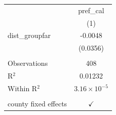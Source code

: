 
\begingroup
\centering
\begin{tabular}{lc}
   \toprule
                        & pref\_cal\\   
                        & (1)\\  
   \midrule 
   dist\_groupfar       & -0.0048\\   
                        & (0.0356)\\   
    \\
   Observations         & 408\\  
   R$^2$                & 0.01232\\  
   Within R$^2$         & $3.16\times 10^{-5}$\\   
    \\
   county fixed effects & $\checkmark$\\   
   \bottomrule
\end{tabular}
\par\endgroup


